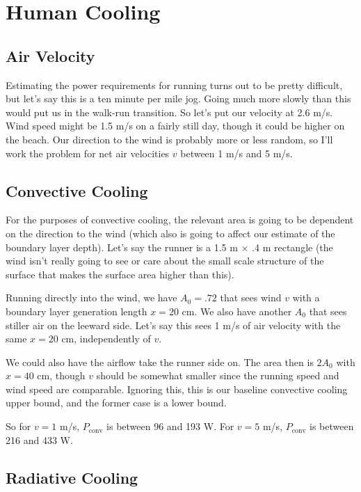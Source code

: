 \documentclass[12pt]{article}
\begin{document}
\section{Human Cooling}

\subsection{Air Velocity}

Estimating the power requirements for running turns out to be pretty difficult, but let's say this is a ten minute per mile jog. Going much more slowly than this would put us in the walk-run transition. So let's put our velocity at 2.6 m/s. Wind speed might be 1.5 m/s on a fairly still day, though it could be higher on the beach. Our direction to the wind is probably more or less random, so I'll work the problem for net air velocities \(v\) between 1 m/s and 5 m/s.

\subsection{Convective Cooling}

For the purposes of convective cooling, the relevant area is going to be dependent on the direction to the wind (which also is going to affect our estimate of the boundary layer depth). Let's say the runner is a 1.5 m \(\times\) .4 m rectangle (the wind isn't really going to see or care about the small scale structure of the surface that makes the surface area higher than this).

Running directly into the wind, we have \(A_0 = .72\) \msq that sees wind \(v\) with a boundary layer generation length \(x = 20\) cm. We also have another \(A_0\) that sees stiller air on the leeward side. Let's say this sees 1 m/s of air velocity with the same \(x=20\) cm, independently of \(v\).

We could also have the airflow take the runner side on. The area then is \(2A_0\) with \(x=40\) cm, though \(v\) should be somewhat smaller since the running speed and wind speed are comparable. Ignoring this, this is our baseline convective cooling upper bound, and the former case is a lower bound.

So for \(v=1\) m/s, \(P_{\mathrm{conv}}\) is between 96 and 193 W. For \(v=5\) m/s,  \(P_{\mathrm{conv}}\) is between 216 and 433 W.

\subsection{Radiative Cooling}
\end{document}
